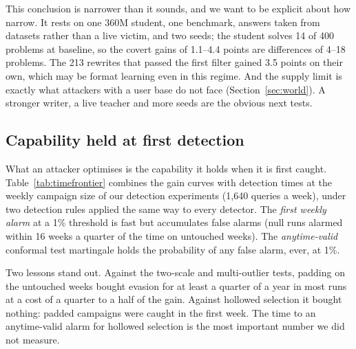 This conclusion is narrower than it sounds, and we want to be explicit about how narrow. It rests on one 360M student, one benchmark, answers taken from datasets rather than a live victim, and two seeds; the student solves 14 of 400 problems at baseline, so the covert gains of 1.1--4.4 points are differences of 4--18 problems. The 213 rewrites that passed the first filter gained 3.5 points on their own, which may be format learning even in this regime. And the supply limit is exactly what attackers with a user base do not face (Section~\ref{sec:world}). A stronger writer, a live teacher and more seeds are the obvious next tests.

\subsection{Capability held at first detection}

What an attacker optimises is the capability it holds when it is first caught. Table~\ref{tab:timefrontier} combines the gain curves with detection times at the weekly campaign size of our detection experiments (1{,}640 queries a week), under two detection rules applied the same way to every detector. The \emph{first weekly alarm} at a 1\% threshold is fast but accumulates false alarms (null runs alarmed within 16 weeks a quarter of the time on untouched weeks). The \emph{anytime-valid} conformal test martingale holds the probability of any false alarm, ever, at 1\%.



Two lessons stand out. Against the two-scale and multi-outlier tests, padding on the untouched weeks bought evasion for at least a quarter of a year in most runs at a cost of a quarter to a half of the gain. Against hollowed selection it bought nothing: padded campaigns were caught in the first week. The time to an anytime-valid alarm for hollowed selection is the most important number we did not measure.
